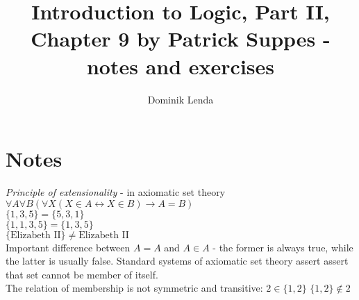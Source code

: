 \documentclass{article}
\title{Introduction to Logic, Part II, Chapter 9 by Patrick Suppes - notes and exercises}
\author{Dominik Lenda}
\begin{document}
\maketitle

\section{Notes}
\emph{Principle of extensionality} - in axiomatic set theory\\
\smallskip
$\forall A \forall B (\forall X (X \in A \leftrightarrow X \in B) \rightarrow A = B)$\\
\smallskip
$\{1, 3, 5\} = \{5, 3, 1\}$\\
\smallskip
$\{1, 1, 3, 5\} = \{1, 3, 5\}$\\
\smallskip
$\{\text{Elizabeth II}\} \neq \text{Elizabeth II}$\\
Important difference between $A = A$ and $A \in A$ - the former is always true, while the latter is usually false. Standard systems of axiomatic set theory assert assert that set cannot be member of itself.\\
The relation of membership is not symmetric and transitive:
$2 \in \{1, 2\}$
$\{1, 2\} \notin 2$
\smallskip
\end{document}
